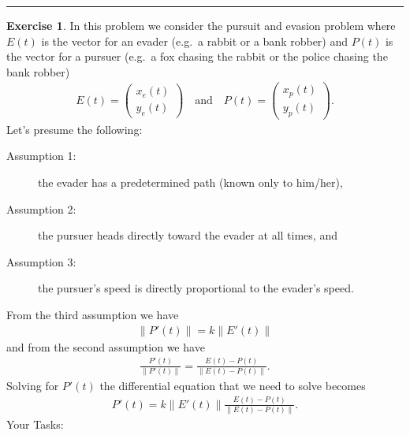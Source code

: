 \documentclass[
]{book}
\theoremstyle{definition}
\theoremstyle{definition}
\theoremstyle{definition}
\newtheorem{exercise}{Exercise}[chapter]
\theoremstyle{remark}
\begin{document}
\begin{center}\rule{0.5\linewidth}{0.5pt}\end{center}

\begin{exercise}
\protect\hypertarget{exr:unnamed-chunk-504}{}{\label{exr:unnamed-chunk-504} }In this problem we consider the pursuit and evasion problem where \(E(t)\)
is the vector for an evader (e.g.~a rabbit or a bank robber) and \(P(t)\)
is the vector for a pursuer (e.g.~a fox chasing the rabbit or the police
chasing the bank robber) \[\begin{aligned}
        E(t) = \begin{pmatrix} x_e(t) \\ y_e(t) \end{pmatrix} \quad \text{and} \quad P(t)
        = \begin{pmatrix} x_p(t) \\ y_p(t) \end{pmatrix}.
    \end{aligned}\] Let's presume the following:

\begin{description}
\item[Assumption 1:]
the evader has a predetermined path (known only to him/her),
\item[Assumption 2:]
the pursuer heads directly toward the evader at all times, and
\item[Assumption 3:]
the pursuer's speed is directly proportional to the evader's speed.
\end{description}

From the third assumption we have \[\begin{aligned}
        \| P'(t) \| = k \| E'(t) \| 
        \label{eqn:pursuit_evasion_assumption3}
    \end{aligned}\] and from the second assumption we have
\[\begin{aligned}
        \frac{P'(t)}{\|P'(t)\|} = \frac{E(t) - P(t)}{\| E(t) - P(t)\|}.
    \end{aligned}\] Solving for \(P'(t)\)
the differential equation
that we need to solve becomes \[\begin{aligned}
        P'(t) = k \| E'(t) \| \frac{E(t) - P(t)}{\| E(t) - P(t)\|}.
    \end{aligned}\] Your Tasks:


\end{exercise}
\end{document}
